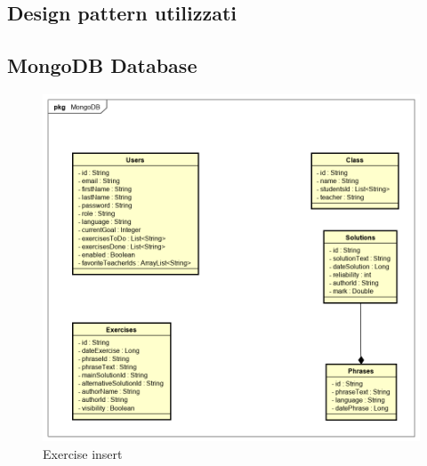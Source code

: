 \subsection{Design pattern utilizzati}


\subsection{MongoDB Database}
\begin{figure}[H]
\centering
\includegraphics[width=17cm, keepaspectratio]{img/mongodb.png} 
\caption{Exercise insert}
\end{figure}